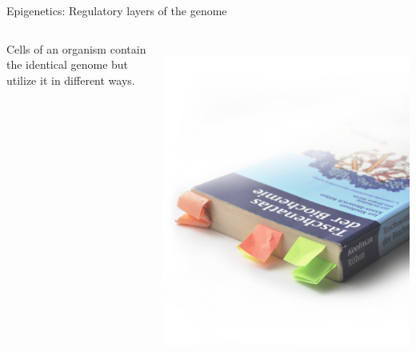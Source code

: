 \documentclass[10pt]{beamer}
\begin{document}
\begin{frame}[fragile]{Epigenetics: Regulatory layers of the genome}
	\begin{columns}
		
		Cells of an organism contain the identical genome but utilize it in different ways.
		
		\vspace{2em} \\ \hfill \includegraphics[height=0.8\textheight]{./figures/lesezeichen.png} 
	\end{columns}
\end{frame}
\end{document}
